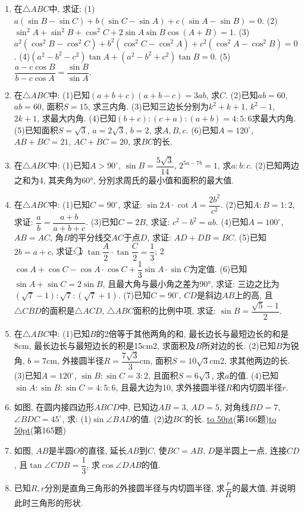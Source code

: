 \documentclass[10pt,a4paper]{article}
\newcommand{\blank}[1]{\underline{\hbox to #1pt{}}}
\begin{document}
\begin{enumerate}[1.]
\item 在$\triangle ABC$中, 求证:
(1)$a(\sin B-\sin C)+b(\sin C-\sin A)+c(\sin A-\sin B)=0$.
(2)$\sin ^2A+\sin ^2B+\cos ^2C+2\sin A\sin B\cos (A+B)=1$.
(3)$a^2(\cos ^2B-\cos ^2C)+b^2(\cos ^2C-\cos ^2A)+c^2(\cos ^2A-\cos ^2B)=0$.
(4)$(a^2-b^2-c^2)\tan A+(a^2-b^2+c^2)\tan B=0$.
(5)$\dfrac{a-c\cos B}{b-c\cos A}=\dfrac{\sin B}{\sin A}$.
\item 在$\triangle ABC$中:
(1)已知$(a+b+c)(a+b-c)=3ab$, 求$C$.
(2)已知$ab=60$, $ab=60$, 面积$S=15$, 求三内角.
(3)已知三边长分别为$k^2+k+1$, $k^2-1$, $2k+1$, 求最大内角.
(4)已知$(b+c):(c+a):(a+b)=4:5:6$求最大内角.
(5)已知面积$S=\sqrt 3$, $a=2\sqrt 3$, $b=2$, 求$A,B,c$.
(6)已知$A=120^\circ$, $AB+BC=21$, $AC+BC=20$, 求$BC$的长.
\item 在$\triangle ABC$中:
(1)已知$A>90^{\circ }$, $\sin B=\dfrac{5\sqrt 3}{14}$, $2^{5a-7b}=1$, 求$a:b:c$.
(2)已知两边之和为4, 其夹角为60°, 分別求周氏的最小值和面积的最大值.
\item 在$\triangle ABC$中:
(1)已知$C=90^{\circ }$, 求证: $\sin 2A\cdot \cot A=\dfrac{2b^2}{c^2}$.
(2)已知$A:B=1:2$, 求证: $\dfrac ab=\dfrac{a+b}{a+b+c}$.
(3)已知$C=2B$, 求证: $c^2-b^2=ab$.
(4)已知$A=100^\circ$, $AB=AC$, 角$B$的平分线交$AC$于点$D$, 求证: $AD+DB=BC$.
(5)已知$2b=a+c$, 求证:
\textcircled{1} $\tan \dfrac A2\cdot \tan \dfrac C2=\dfrac 13$;
\textcircled{2} $\cos A+\cos C-\cos A\cdot \cos C+\dfrac 13\sin A\cdot \sin C$为定值.
(6)已知$\sin A+\sin C=2\sin B$, 且最大角与最小角之差为90°, 求证: 三边之比为$(\sqrt 7-1):\sqrt 7:(\sqrt 7+1)$.
(7)已知$C=90^\circ$, $CD$是斜边$AB$上的高, 且$\triangle CBD$的面积是$\triangle ACD$, $\triangle ABC$面积的比例中项, 求证: $\sin B=\dfrac{\sqrt 5-1}2$.
\item 在$\triangle ABC$中:
(1)已知$B$的2倍等于其他两角的和, 最长边长与最短边长的和是8cm, 最长边长与最短边长的积是15cm2, 求面积及$B$所对边的长.
(2)已知$B$为锐角, $b=7$cm, 外接圆半径$R=\dfrac{7\sqrt 3}3$cm, 面积$S=10\sqrt 3$cm2, 求其他两边的长.
(3)已知$A=120^\circ$, $\sin B:\sin C=3:2$, 且面积$S=6\sqrt 3$, 求$a$的值.
(4)已知$\sin A:\sin B:\sin C=4:5:6$, 且最大边为10, 求外接圆半径$R$和内切圆半径$r$.
\item 如图, 在圆内接四边形$ABCD$中, 已知边$AB=3$, $AD=5$, 对角线$BD=7$, $\angle BDC=45^\circ$, 求:
(1)$\sin \angle BAD$的值.						(2)边$BC$的长.
\blank{50}(第166题)\blank{50}(第165题)
\item 如图, $AB$是半圆$O$的直径, 延长$AB$到$C$, 使$BC=AB$, $D$是半圆上一点, 连接$CD$, 且$\tan \angle CDB=\dfrac 13$, 求$\cos \angle DAB$的值.
\item 已知$R,r$分別是直角三角形的外接圆半径与内切圆半径, 求$\dfrac rR$的最大值, 并说明此时三角形的形状.

\end{enumerate}
\end{document}

